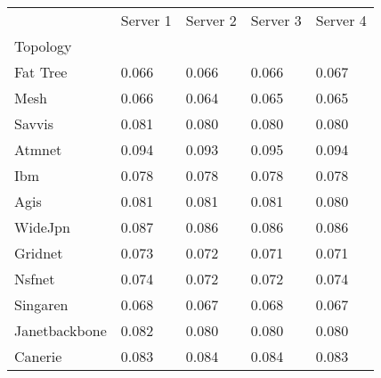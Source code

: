 \begin{tabular}{lllll}
 & Server 1 & Server 2 & Server 3 & Server 4 \\
Topology &  &  &  &  \\
Fat Tree & 0.066 & 0.066 & 0.066 & 0.067 \\
Mesh & 0.066 & 0.064 & 0.065 & 0.065 \\
Savvis & 0.081 & 0.080 & 0.080 & 0.080 \\
Atmnet & 0.094 & 0.093 & 0.095 & 0.094 \\
Ibm & 0.078 & 0.078 & 0.078 & 0.078 \\
Agis & 0.081 & 0.081 & 0.081 & 0.080 \\
WideJpn & 0.087 & 0.086 & 0.086 & 0.086 \\
Gridnet & 0.073 & 0.072 & 0.071 & 0.071 \\
Nsfnet & 0.074 & 0.072 & 0.072 & 0.074 \\
Singaren & 0.068 & 0.067 & 0.068 & 0.067 \\
Janetbackbone & 0.082 & 0.080 & 0.080 & 0.080 \\
Canerie & 0.083 & 0.084 & 0.084 & 0.083 \\
\end{tabular}

